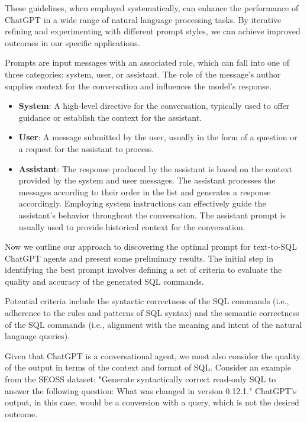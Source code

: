 These guidelines, when employed systematically, can enhance the performance of ChatGPT in a wide range of natural language processing tasks. By iterative refining and experimenting with different prompt styles, we can achieve improved outcomes in our specific applications.


Prompts are input messages with an associated role, which can fall into one of three categories: system, user, or assistant. The role of the message's author supplies context for the conversation and influences the model's response. \cite{openai2023gpt4}

\begin{itemize}
    \item \textbf{System}: A high-level directive for the conversation, typically used to offer guidance or establish the context for the assistant.
    \item \textbf{User}: A message submitted by the user, usually in the form of a question or a request for the assistant to process.
    \item \textbf{Assistant}: The response produced by the assistant is based on the context provided by the system and user messages. The assistant processes the messages according to their order in the list and generates a response accordingly. Employing system instructions can effectively guide the assistant's behavior throughout the conversation. The assistant prompt is usually used to provide historical context for the conversation.
\end{itemize}

Now we outline our approach to discovering the optimal prompt for text-to-SQL ChatGPT agents and present some preliminary results.
The initial step in identifying the best prompt involves defining a set of criteria to evaluate the quality and accuracy of the generated SQL commands.

Potential criteria include the syntactic correctness of the SQL commands (i.e., adherence to the rules and patterns of SQL syntax) and the semantic correctness of the SQL commands (i.e., alignment with the meaning and intent of the natural language queries).

Given that ChatGPT is a conversational agent, we must also consider the quality of the output in terms of the context and format of SQL.
Consider an example from the SEOSS dataset: "Generate syntactically correct read-only SQL to answer the following question: What was changed in version 0.12.1." ChatGPT's output, in this case, would be a conversion with a query, which is not the desired outcome.

